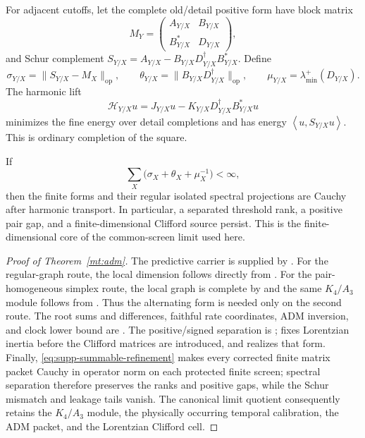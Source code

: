 \documentclass[11pt]{article}
\theoremstyle{definition}
\theoremstyle{remark}
\newcommand{\norm}[1]{\lVert#1\rVert}
\newcommand{\ip}[2]{\left\langle #1,#2\right\rangle}
\newcommand{\op}{\mathrm{op}}
\begin{document}
For adjacent cutoffs, let the complete old/detail positive form have block
matrix
\begin{equation}
 M_Y=\begin{pmatrix}A_{Y/X}&B_{Y/X}\\
                     B_{Y/X}^*&D_{Y/X}\end{pmatrix},
 \label{eq:supp-refinement-block}
\end{equation}
and Schur complement
$S_{Y/X}=A_{Y/X}-B_{Y/X}D_{Y/X}^{\dagger}B_{Y/X}^*$.  Define
\begin{equation}
 \sigma_{Y/X}=\norm{S_{Y/X}-M_X}_{\op},
 \qquad
 \theta_{Y/X}=\norm{B_{Y/X}D_{Y/X}^{\dagger}}_{\op},
 \qquad
 \mu_{Y/X}=\lambda_{\min}^+(D_{Y/X}).
 \label{eq:supp-refinement-defects}
\end{equation}
The harmonic lift
\begin{equation}
 \mathcal H_{Y/X}u
 =J_{Y/X}u-K_{Y/X}D_{Y/X}^{\dagger}B_{Y/X}^*u
 \label{eq:supp-harmonic-lift}
\end{equation}
minimizes the fine energy over detail completions and has energy
$\ip{u}{S_{Y/X}u}$.  This is ordinary completion of the square.

If
\begin{equation}
 \sum_X\bigl(\sigma_X+\theta_X+\mu_X^{-1}\bigr)<\infty,
 \label{eq:supp-summable-refinement}
\end{equation}
then the finite forms and their regular isolated spectral projections are
Cauchy after harmonic transport.  In particular, a separated threshold rank,
a positive pair gap, and a finite-dimensional Clifford source persist.  This
is the finite-dimensional core of the common-screen limit used here.

\begin{proof}[Proof of Theorem~\ref{mt:adm}]
The predictive carrier is supplied by .
For the regular-graph route, the local dimension follows directly from
.  For the pair-homogeneous simplex route, the
local graph is complete by  and the same
$K_4/A_3$ module follows from .
Thus the alternating form is needed only on the second route.  The root sums and
differences, faithful rate coordinates, ADM inversion, and clock lower bound
are .
The positive/signed separation is ;
 fixes Lorentzian inertia before the
Clifford matrices are introduced, and
 realizes that form.
Finally,
\eqref{eq:supp-summable-refinement} makes every corrected finite matrix packet
Cauchy in operator norm on each protected finite screen; spectral separation
therefore preserves the ranks and positive gaps, while the Schur mismatch and
leakage tails vanish.  The canonical limit quotient consequently retains the
$K_4/A_3$ module, the physically occurring temporal calibration, the ADM packet,
and the Lorentzian Clifford cell.
\end{proof}
\end{document}
